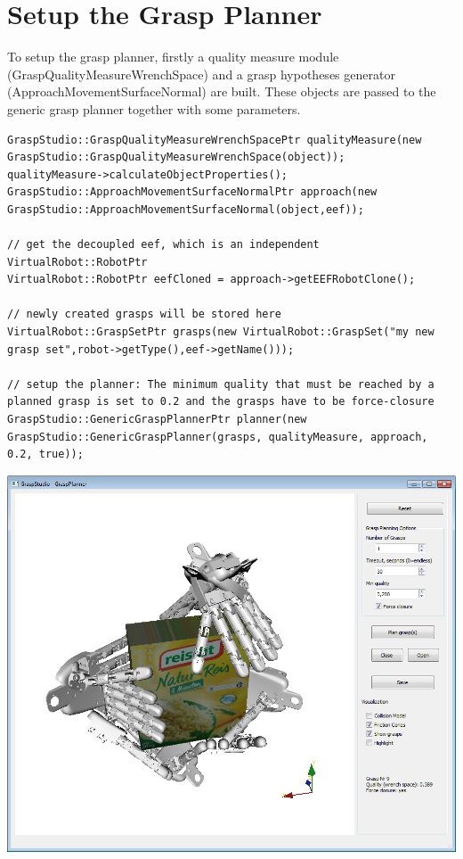 \documentclass{book}
\begin{document}
\section{Setup the Grasp Planner}
To setup the grasp planner, firstly a quality measure module (GraspQualityMeasureWrenchSpace) and a grasp hypotheses generator (ApproachMovementSurfaceNormal) are built. These objects are passed to the generic grasp planner together with some parameters. 
\begin{lstlisting}
GraspStudio::GraspQualityMeasureWrenchSpacePtr qualityMeasure(new GraspStudio::GraspQualityMeasureWrenchSpace(object));
qualityMeasure->calculateObjectProperties();
GraspStudio::ApproachMovementSurfaceNormalPtr approach(new GraspStudio::ApproachMovementSurfaceNormal(object,eef));

// get the decoupled eef, which is an independent VirtualRobot::RobotPtr
VirtualRobot::RobotPtr eefCloned = approach->getEEFRobotClone();

// newly created grasps will be stored here 
VirtualRobot::GraspSetPtr grasps(new VirtualRobot::GraspSet("my new grasp set",robot->getType(),eef->getName()));

// setup the planner: The minimum quality that must be reached by a planned grasp is set to 0.2 and the grasps have to be force-closure
GraspStudio::GenericGraspPlannerPtr planner(new GraspStudio::GenericGraspPlanner(grasps, qualityMeasure, approach, 0.2, true));
\end{lstlisting}
\includegraphics[width=\textwidth]{GraspPlanner}
\end{document}

